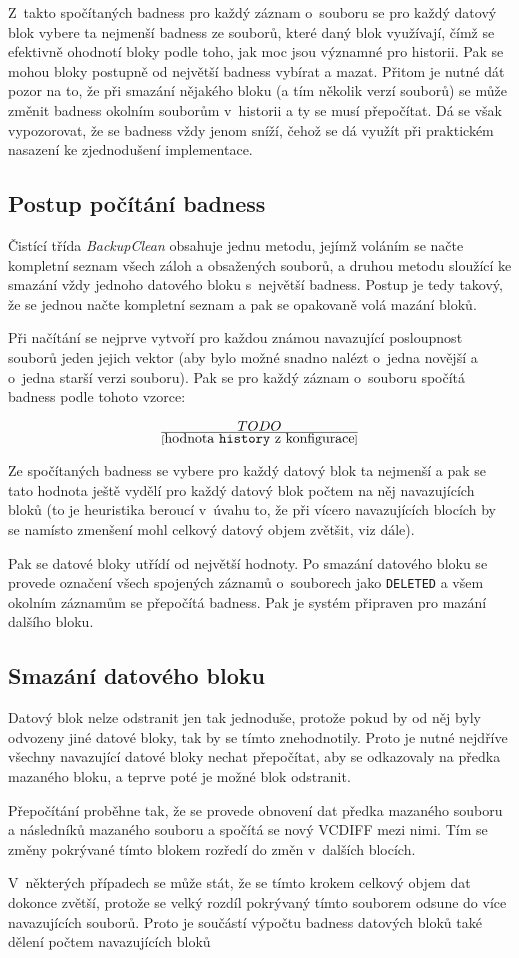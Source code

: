 Z~takto spočítaných badness pro každý záznam o~souboru se pro každý datový
blok vybere ta nejmenší badness ze souborů, které daný blok využívají, čímž se
efektivně ohodnotí bloky podle toho, jak moc jsou významné pro historii. Pak se
mohou bloky postupně od největší badness vybírat a mazat. Přitom je nutné dát
pozor na to, že při smazání nějakého bloku (a tím několik verzí souborů) se
může změnit badness okolním souborům v~historii a ty se musí přepočítat. Dá se
však vypozorovat, že se badness vždy jenom sníží, čehož se dá využít při
praktickém nasazení ke zjednodušení implementace.

\subsection{Postup počítání badness}

Čistící třída {\it BackupClean} obsahuje jednu metodu, jejímž voláním se načte
kompletní seznam všech záloh a obsažených souborů, a druhou metodu sloužící ke
smazání vždy jednoho datového bloku s~největší badness. Postup je tedy takový,
že se jednou načte kompletní seznam a pak se opakovaně volá mazání bloků.

Při načítání se nejprve vytvoří pro každou známou navazující posloupnost souborů
jeden jejich vektor (aby bylo možné snadno nalézt o~jedna novější a o~jedna
starší verzi souboru). Pak se pro každý záznam o~souboru spočítá badness podle
tohoto vzorce:

$$TODO\over[\hbox{hodnota \texttt{history} z konfigurace}]$$

Ze spočítaných badness se vybere pro každý datový blok ta nejmenší a pak se
tato hodnota ještě vydělí pro každý datový blok počtem na něj navazujících bloků
(to je heuristika beroucí v~úvahu to, že při vícero navazujících blocích by se
namísto zmenšení mohl celkový datový objem zvětšit, viz dále).

Pak se datové bloky utřídí od největší hodnoty. Po smazání datového bloku se
provede označení všech spojených záznamů o~souborech jako \texttt{DELETED} a
všem okolním záznamům se přepočítá badness. Pak je systém připraven pro mazání
dalšího bloku.

\subsection{Smazání datového bloku}

Datový blok nelze odstranit jen tak jednoduše, protože pokud by od něj byly
odvozeny jiné datové bloky, tak by se tímto znehodnotily. Proto je nutné
nejdříve všechny navazující datové bloky nechat přepočítat, aby se odkazovaly
na předka mazaného bloku, a teprve poté je možné blok odstranit.

Přepočítání proběhne tak, že se provede obnovení dat předka mazaného souboru a následníků mazaného souboru a spočítá se nový \gls{VCDIFF} mezi nimi. Tím se
změny pokrývané tímto blokem rozředí do změn v~dalších blocích.

V~některých případech se může stát, že se tímto krokem celkový objem dat dokonce
zvětší, protože se velký rozdíl pokrývaný tímto souborem odsune do více
navazujících souborů. Proto je součástí výpočtu badness datových bloků také
dělení počtem navazujících bloků
